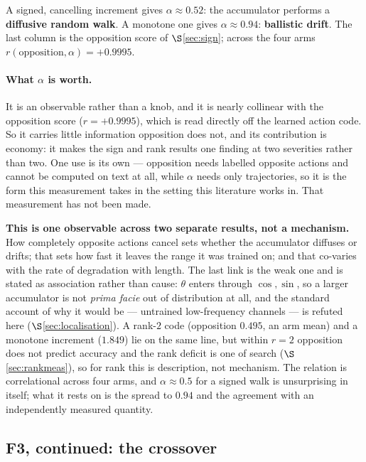 \documentclass[11pt]{article}
\begin{document}
\noindent A signed, cancelling increment gives $\alpha \approx 0.52$: the
accumulator performs a \textbf{diffusive random walk}. A monotone one gives
$\alpha \approx 0.94$: \textbf{ballistic drift}. The last column is the opposition score of
$\S$\ref{sec:sign}; across the four arms $r(\text{opposition},\alpha) = +0.9995$.

\paragraph{What $\alpha$ is worth.} It is an observable rather than a knob, and it
is nearly collinear with the opposition score ($r = +0.9995$), which is read
directly off the learned action code. So it carries little information opposition
does not, and its contribution is economy: it makes the sign and rank results one
finding at two severities rather than two. One use is its own --- opposition needs
labelled opposite actions and cannot be computed on text at all, while $\alpha$
needs only trajectories, so it is the form this measurement takes in the setting
this literature works in. That measurement has not been made.

\textbf{This is one observable across two separate results, not a mechanism.} How
completely opposite actions cancel sets whether the accumulator diffuses or drifts;
that sets how fast it leaves the range it was trained on; and that co-varies with the
rate of degradation with length. The last link is the weak one and is stated as association rather than
cause: $\theta$ enters through $\cos,\sin$, so a larger accumulator is not
\emph{prima facie} out of distribution at all, and the standard account of why it
would be --- untrained low-frequency channels --- is refuted here
($\S$\ref{sec:localisation}). A rank-$2$ code (opposition $0.495$, an arm mean) and a
monotone increment ($1.849$) lie on the same line, but within $r=2$ opposition does not
predict accuracy and the rank deficit is one of search ($\S$\ref{sec:rankmeas}), so for
rank this is description, not mechanism. The relation is correlational across four
arms, and $\alpha\approx0.5$ for a signed walk is unsurprising in itself; what it
rests on is the spread to $0.94$ and the agreement with an independently measured
quantity.


\subsection{F3, continued: the crossover}
\label{sec:crossover}
\end{document}
